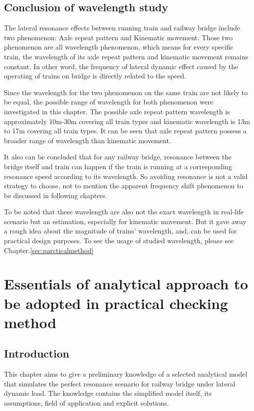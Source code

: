 \section{Conclusion of wavelength study}

The lateral resonance effects between running train and railway bridge include two phenomenon: Axle repeat pattern and Kinematic movement. Those two phenomenon are all wavelength phenomenon, which means for every specific train, the wavelength of its axle repeat pattern and kinematic movement remains constant. In other word, the frequency of lateral dynamic effect caused by the operating of trains on bridge is directly related to the speed.

Since the wavelength for the two phenomenon on the same train are not likely to be equal, the possible range of wavelength for both phenomenon were investigated in this chapter. The possible axle repeat pattern wavelength is approximately 10m-30m covering all train types and kinematic wavelength is 13m to 17m covering all train types. It can be seen that axle repeat pattern possess a broader range of wavelength than kinematic movement.

It also can be concluded that for any railway bridge, resonance between the bridge itself and train can happen if the train is running at a corresponding resonance speed according to its wavelength. So avoiding resonance is not a valid strategy to choose, not to mention the apparent frequency shift phenomenon to be discussed in following chapters. 

To be noted that these wavelength are also not the exact wavelength in real-life scenario but an estimation, especially for kinematic movement. But it gave away a rough idea about the magnitude of trains' wavelength, and, can be used for practical design purposes. To see the usage of studied wavelength, please see Chapter.\ref{sec:parcticalmethod}



\chapter{Essentials of analytical approach to be adopted in practical checking method}
 
\section{Introduction}
This chapter aims to give a preliminary knowledge of a selected analytical model that simulates the perfect resonance scenario for railway bridge under lateral dynamic load. The knowledge contains the simplified model itself, its assumptions, field of application and explicit solutions. 

